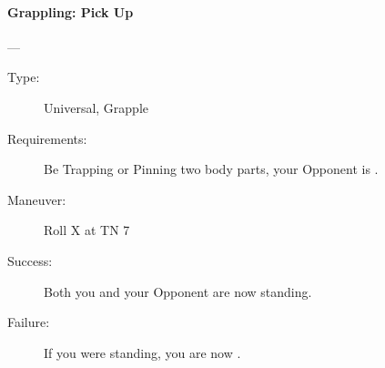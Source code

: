 \paragraph{Grappling: Pick Up \large} \label{man:grappling-pick-up}
---
\vspace{-10pt} \begin{description}
\item [Type:]
 Universal, Grapple
\item [Requirements:]
 Be Trapping or Pinning two body parts, your Opponent is .
\item [Maneuver:]
 Roll X at TN 7
\item [Success:]
 Both you and your Opponent are now standing.
\item [Failure:]
 If you were standing, you are now .
\end{description}
